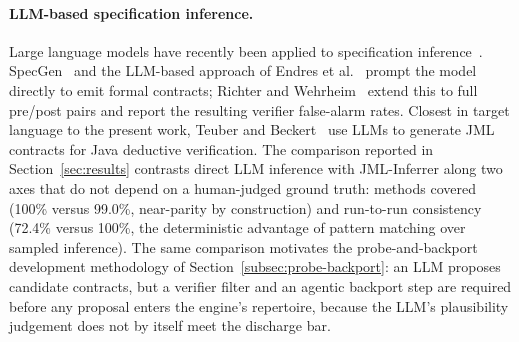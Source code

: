 \paragraph{LLM-based specification inference.}
Large language models have recently been applied to specification inference~\cite{ma2024specgen, endres2024can, richter2025beyondpostconditions, teuber2025nextsteps}. SpecGen~\cite{ma2024specgen} and the LLM-based approach of Endres et al.~\cite{endres2024can} prompt the model directly to emit formal contracts; Richter and Wehrheim~\cite{richter2025beyondpostconditions} extend this to full pre/post pairs and report the resulting verifier false-alarm rates. Closest in target language to the present work, Teuber and Beckert~\cite{teuber2025nextsteps} use LLMs to generate JML contracts for Java deductive verification. The comparison reported in Section~\ref{sec:results} contrasts direct LLM inference with JML-Inferrer along two axes that do not depend on a human-judged ground truth: methods covered (100\% versus 99.0\%, near-parity by construction) and run-to-run consistency (72.4\% versus 100\%, the deterministic advantage of pattern matching over sampled inference). The same comparison motivates the probe-and-backport development methodology of Section~\ref{subsec:probe-backport}: an LLM proposes candidate contracts, but a verifier filter and an agentic backport step are required before any proposal enters the engine's repertoire, because the LLM's plausibility judgement does not by itself meet the discharge bar.

